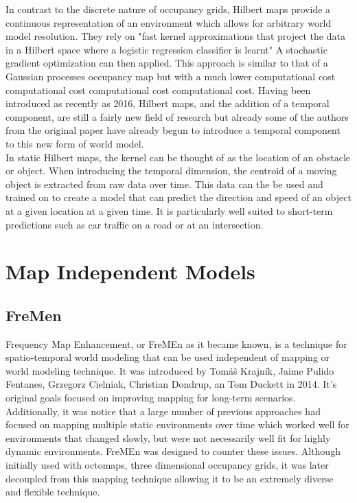   In contrast to the discrete nature of occupancy grids, Hilbert maps provide a
  continuous representation of an environment which allows for arbitrary world
  model resolution. They rely on "fast kernel approximations that project the
  data in a Hilbert space where a logistic regression classifier is learnt"
  A stochastic gradient optimization can then applied. This approach is similar to
  that of a Gaussian processes occupancy map but with a much lower computational
  cost computational cost computational cost computational cost. Having been
  introduced as recently as 2016, Hilbert maps, and the addition of a temporal
  component, are still a fairly new field of research but already some of the
  authors from the original paper have already begun to introduce a temporal
  component to this new form of world model. \cite{Ramos2016, Senanayake2016} \\

  In static Hilbert maps, the kernel can be thought of as the location of an
  obstacle or object. When introducing the temporal dimension, the centroid of a
  moving object is extracted from raw data over time. This data can the be used
  and trained on to create a model that can predict the direction and speed of an
  object at a given location at a given time. It is particularly well suited to
  short-term predictions such as car traffic on a road or at an intersection.
  \cite{Senanayake2016} \cite{Senanayake2017}

  \section{ Map Independent Models }

  \subsection{ FreMen }

  Frequency Map Enhancement, or FreMEn as it became known, is a technique for
  spatio-temporal world modeling that can be used independent of mapping or
  world modeling technique. It was introduced by Tomáš Krajník, Jaime Pulido
  Fentanes, Grzegorz Cielniak, Christian Dondrup, an Tom Duckett in 2014. It's
  original goals focused on improving mapping for long-term scenarios.
  Additionally, it was notice that a large number of previous approaches had
  focused on mapping multiple static environments over time which worked well
  for environments that changed slowly, but were not necessarily well fit for
  highly dynamic environments. FreMEn was designed to counter these issues.
  \cite{Fentanes2014} Although initially used with octomaps, three dimensional
  occupancy grids, it was later decoupled from this mapping technique allowing
  it to be an extremely diverse and flexible technique. \\


